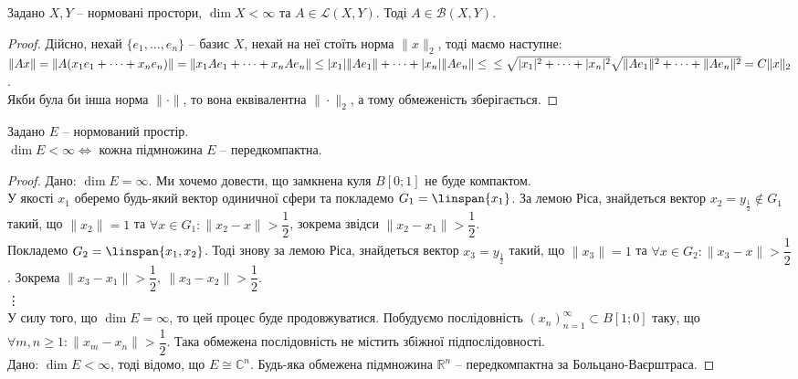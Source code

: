 \begin{proposition}
Задано $X,Y$ -- нормовані простори, $\dim X < \infty$ та $A \in \mathcal{L}(X,Y)$. Тоді $A \in \mathcal{B}(X,Y)$.
\end{proposition}

\begin{proof}
Дійсно, нехай $\{e_1,\dots,e_n\}$ -- базис $X$, нехай на неї стоїть норма $\|x\|_2$, тоді маємо наступне:\\
$\|Ax\| = \|A (x_1 e_1 + \dots + x_n e_n) \| = \| x_1 A e_1 + \dots + x_n A e_n \| \leq |x_1| \|A e_1 \| + \dots + |x_n| \|A e_n \| \leq \\
\leq \sqrt{|x_1|^2 + \dots + |x_n|^2} \sqrt{\|Ae_1\|^2 + \dots + \|Ae_n\|^2} = C \|x\|_2$.\\
Якби була би інша норма $\| \cdot \|$, то вона еквівалентна $\| \cdot \|_2$, а тому обмеженість зберігається.
\end{proof}

\begin{theorem}
Задано $E$ -- нормований простір.\\
$\dim E < \infty \iff$ кожна підмножина $E$ -- передкомпактна.
\end{theorem}

\begin{proof}
\leftproof Дано: $\dim E = \infty$. Ми хочемо довести, що замкнена куля $B[0;1]$ не буде компактом.\\
У якості $x_1$ оберемо будь-який вектор одиничної сфери та покладемо $G_1 = \linspan\{x_1\}$. За лемою Ріса, знайдеться вектор $x_2 = y_{\frac{1}{2}} \notin G_1$ такий, що $\|x_2\| = 1$ та $\forall x \in G_1: \|x_2-x\| > \dfrac{1}{2}$, зокрема звідси $\|x_2 - x_1\| > \dfrac{1}{2}$.\\
Покладемо $G_2 = \linspan\{x_1,x_2\}$. Тоді знову за лемою Ріса, знайдеться вектор $x_3 = y_{\frac{1}{2}}$ такий, що $\|x_3\| = 1$ та $\forall x \in G_2: \|x_3-x\| > \dfrac{1}{2}$. Зокрема $\|x_3 - x_1\| > \dfrac{1}{2},\ \|x_3 - x_2\| > \dfrac{1}{2}$.\\
\vdots \\
У силу того, що $\dim E = \infty$, то цей процес буде продовжуватися. Побудуємо послідовність $(x_n)_{n=1}^\infty \subset B[1;0]$ таку, що $\forall m,n \geq 1: \| x_m - x_n \| > \dfrac{1}{2}$. Така обмежена послідовність не містить збіжної підпослідовності.
\bigskip \\
\rightproof Дано: $\dim E < \infty$, тоді відомо, що $E \cong \mathbb{C}^n$. Будь-яка обмежена підмножина $\mathbb{R}^n$ -- передкомпактна за Больцано-Ваєрштраса.
\end{proof}
\newpage
\fi

